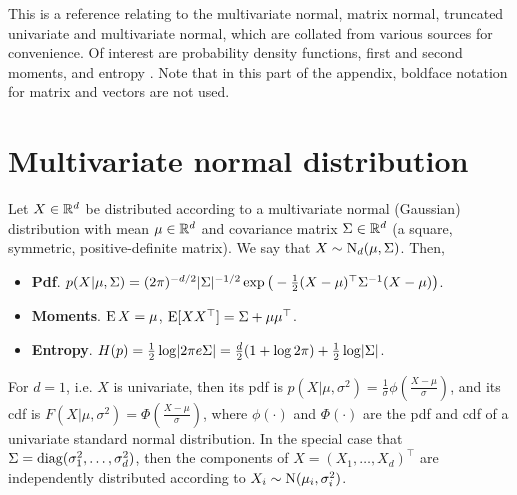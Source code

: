 This is a reference relating to the multivariate normal,  matrix normal, truncated univariate and multivariate normal, which are collated from various sources for convenience.
Of interest are probability density functions, first and second moments, and entropy .
Note that in this part of the appendix, boldface notation for matrix and vectors are not used.

\section{Multivariate normal distribution}
\label{apx:fishermultinormal}

Let $X\in\bbR^d$ be distributed according to a multivariate normal (Gaussian) distribution with mean $\mu \in \bbR^d$ and covariance matrix $\Sigma \in\bbR^d$ (a square, symmetric, positive-definite matrix).
We say that $X\sim\N_d(\mu,\Sigma)$.
Then,
\begin{itemize}
  \item \textbf{Pdf}. $p(X|\mu,\Sigma) = (2\pi)^{-d/2}|\Sigma|^{-1/2}\exp\big(-\half (X-\mu)^\top\Sigma^{-1}(X-\mu)\big)$.
  \item \textbf{Moments}. $\E X=\mu$, $\E [XX^\top] = \Sigma + \mu \mu^\top$.
  \item \textbf{Entropy}. $H(p) = \half \log \abs{2\pi e \Sigma} = \half[d](1 + \log 2\pi) + \half\log\abs{\Sigma}$.
\end{itemize}

For $d=1$, i.e. $X$ is univariate, then its pdf is $p(X|\mu,\sigma^2) = \frac{1}{\sigma}\phi \left( \frac{X-\mu}{\sigma} \right)$, and its cdf is $F(X|\mu,\sigma^2) = \Phi \left( \frac{X-\mu}{\sigma} \right)$, where $\phi(\cdot)$ and $\Phi(\cdot)$ are the pdf and cdf of a univariate standard normal distribution.
In the special case that $\Sigma = \diag(\sigma_1^2,\dots,\sigma_d^2)$, then the components of $X=(X_1,\dots,X_d)^\top$ are independently distributed according to $X_i\sim\N(\mu_i,\sigma_i^2)$.

